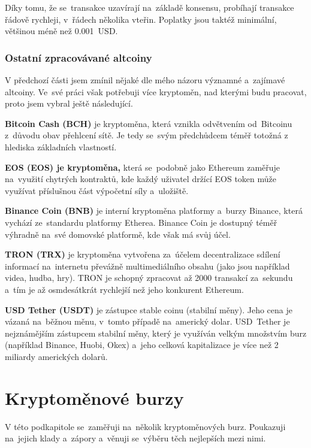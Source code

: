 \documentclass[thesis=B,czech]{FITthesis}[2019/03/21]
\begin{document}
Díky tomu, že se~transakce uzavírají na~základě konsensu, probíhají transakce řádově rychleji, v~řádech několika vteřin. Poplatky jsou taktéž minimální, většinou méně než 0.001~USD. \cite{bitinfocharts, coincodex_ripple} 

\subsubsection{Ostatní zpracovávané altcoiny}
V předchozí části jsem zmínil nějaké dle mého názoru významné a~zajímavé altcoiny. Ve~své práci však potřebuji více kryptoměn, nad kterými budu pracovat, proto jsem vybral ještě následující.

\textbf{Bitcoin Cash (BCH)} je kryptoměna, která vznikla odvětvením od~Bitcoinu z~důvodu obav přehlcení sítě. Je tedy se~svým předchůdcem téměř totožná z hlediska základních vlastností. \cite{kurzy_bch}

\textbf{EOS (EOS) je kryptoměna,} která se~podobně jako Ethereum zaměřuje na~využití chytrých kontraktů, kde každý uživatel držící EOS token může využívat příslušnou část výpočetní síly a~uložiště. \cite{finex_eos}

\textbf{Binance Coin (BNB)} je interní kryptoměna platformy a~burzy Binance, která vychází ze~standardu platformy Etherea. Binance Coin je dostupný téměř výhradně na~své domovské platformě, kde však má svůj účel. \cite{martin_sistek_bnb}

\textbf{TRON (TRX)} je kryptoměna vytvořena za~účelem decentralizace sdílení informací na~internetu převážně multimediálního obsahu (jako jsou například videa, hudba, hry). TRON je schopný zpracovat až 2000 transakcí za~sekundu a~tím je až osmdesátkrát rychlejší než jeho konkurent Ethereum. \cite{finex_trx}

\textbf{USD Tether (USDT)} je zástupce stable coinu (stabilní měny). Jeho cena je vázaná na~běžnou měnu, v~tomto případě na~americký dolar. USD~Tether je nejznámějším zástupcem stabilní měny, který je využíván velkým množstvím burz (například Binance, Huobi, Okex) a~jeho celková kapitalizace je více než 2 miliardy amerických dolarů. \cite{mlady_investor_stable_coin} 

\section{Kryptoměnové burzy}
\label{cryptocurrency_exchanges}
V této podkapitole se~zaměřuji na~několik kryptoměnových burz. Poukazuji na~jejich klady a~zápory a~věnuji se~výběru těch nejlepších mezi nimi.
\end{document}
